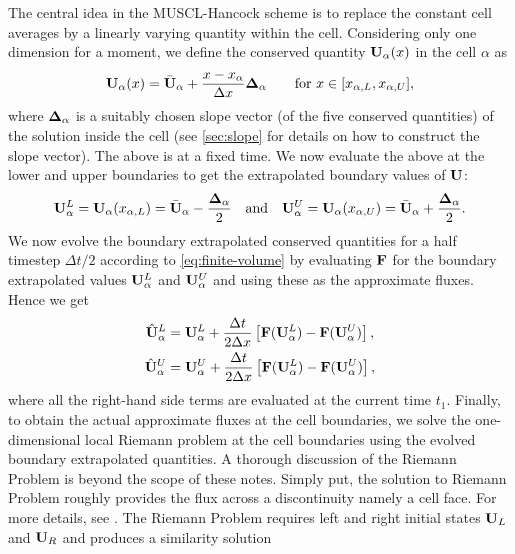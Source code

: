 \documentclass{article}
\begin{document}
The central idea in the MUSCL-Hancock scheme is to replace the constant cell averages by a linearly
varying quantity within the cell. Considering only one dimension for a moment, we define the
conserved quantity $\mathrm{\bf U}_\alpha(x)$ in the cell $\alpha$ as
\begin{align}
  \label{eq:ux}
  \mathrm{\bf U}_\alpha(x) = \bar{\mathrm{\bf U}}_\alpha + \frac{x - x_\alpha}{\Delta x} \mathrm{\bf \Delta}_\alpha
  \qquad\text{for } x\in [x_{\alpha,L}, x_{\alpha,U}],
\end{align}
where $\mathrm{\bf \Delta}_\alpha$ is a suitably chosen slope vector (of the five conserved quantities)
of the solution inside the cell (see \cref{sec:slope} for details on how to construct the slope
vector).
The above is at a fixed time.
We now evaluate the above at the lower and upper boundaries
to get the extrapolated boundary values of $\mathrm{\bf U}$:
\begin{align}
  \label{eq:extrapolated-boundary-values-1d}
  \mathrm{\bf U}^L_\alpha = \mathrm{\bf U}_\alpha(x_{\alpha,L}) =
    \bar{\mathrm{\bf U}}_\alpha - \frac{\mathrm{\bf \Delta}_\alpha}{2}
  \quad \text{and} \quad
  \mathrm{\bf U}^U_\alpha = \mathrm{\bf U}_\alpha(x_{\alpha,U}) =
    \bar{\mathrm{\bf U}}_\alpha + \frac{\mathrm{\bf \Delta}_\alpha}{2}.
\end{align}
We now evolve the boundary extrapolated conserved quantities for a half timestep $\Delta t/2$
according to \cref{eq:finite-volume} by evaluating $\mathrm{\bf F}$ for the boundary extrapolated values
$\mathrm{\bf U}^L_\alpha$ and $\mathrm{\bf U}^U_\alpha$ and using these as the approximate fluxes. Hence
we get
\begin{align}
  \label{eq:half-time-step-1d}
  \hat{\mathrm{\bf U}}^L_\alpha &= \mathrm{\bf U}^L_\alpha + \frac{\Delta t}{2\Delta x}
      \left[\mathrm{\bf F}(\mathrm{\bf U}^L_\alpha) - \mathrm{\bf F}(\mathrm{\bf U}^U_\alpha)\right], \nonumber \\
  \hat{\mathrm{\bf U}}^U_\alpha &= \mathrm{\bf U}^U_\alpha + \frac{\Delta t}{2\Delta x}
      \left[\mathrm{\bf F}(\mathrm{\bf U}^L_\alpha) - \mathrm{\bf F}(\mathrm{\bf U}^U_\alpha)\right],
\end{align}
where all the right-hand side terms are evaluated at the current time $t_1$. Finally, to obtain the
actual approximate fluxes at the cell boundaries, we solve the one-dimensional local Riemann problem
at the cell boundaries using the evolved boundary extrapolated quantities. A thorough discussion of
the Riemann Problem is beyond the scope of these notes. Simply put, the solution to Riemann Problem
roughly provides the flux across a discontinuity namely a cell face. For more details, see \cite{toro}.
The Riemann Problem
requires left and right initial states $\mathrm{\bf U}_L$ and $\mathrm{\bf U}_R$ and produces a similarity solution
\end{document}
